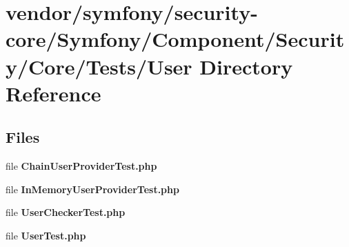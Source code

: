 \section{vendor/symfony/security-\/core/\+Symfony/\+Component/\+Security/\+Core/\+Tests/\+User Directory Reference}
\label{dir_26aaddefa42fbf160ffa87c8bbaa6b75}
\subsection*{Files}
\begin{DoxyCompactItemize}
\item 
file {\bf Chain\+User\+Provider\+Test.\+php}
\item 
file {\bf In\+Memory\+User\+Provider\+Test.\+php}
\item 
file {\bf User\+Checker\+Test.\+php}
\item 
file {\bf User\+Test.\+php}
\end{DoxyCompactItemize}
